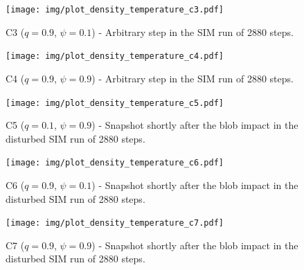     \begin{figure}
        \texttt{[image: img/plot\_density\_temperature\_c3.pdf]}
        \caption{C3 ($q = 0.9$, $\psi = 0.1$) - Arbitrary step in the SIM run of 2880 steps.}
        \label{fig:plot_density_temperature_c3}
    \end{figure}

    \begin{figure}
        \texttt{[image: img/plot\_density\_temperature\_c4.pdf]}
        \caption{C4 ($q = 0.9$, $\psi = 0.9$) - Arbitrary step in the SIM run of 2880 steps.}
        \label{fig:plot_density_temperature_c4}
    \end{figure}
    
    \begin{figure}
        \texttt{[image: img/plot\_density\_temperature\_c5.pdf]}
        \caption{C5 ($q = 0.1$, $\psi = 0.9$) - Snapshot shortly after the blob impact in the disturbed SIM run of 2880 steps.}
        \label{fig:plot_density_temperature_c5}
    \end{figure}

    \begin{figure}
        \texttt{[image: img/plot\_density\_temperature\_c6.pdf]}
        \caption{C6 ($q = 0.9$, $\psi = 0.1$) - Snapshot shortly after the blob impact in the disturbed SIM run of 2880 steps.}
        \label{fig:plot_density_temperature_c6}
    \end{figure}

    \begin{figure}
        \texttt{[image: img/plot\_density\_temperature\_c7.pdf]}
        \caption{C7 ($q = 0.9$, $\psi = 0.9$) - Snapshot shortly after the blob impact in the disturbed SIM run of 2880 steps.}
        \label{fig:plot_density_temperature_c7}
    \end{figure}
    
